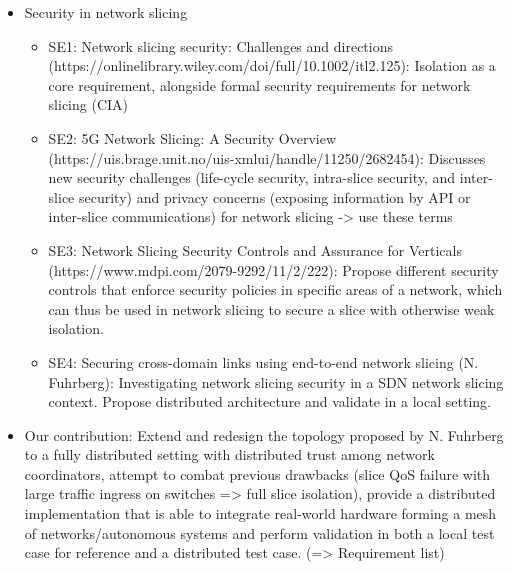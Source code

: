 \documentclass{article}
\begin{document}
\begin{itemize}
\begin{itemize}
    \end{itemize}
    \item Security in network slicing
    \begin{itemize}
        \item SE1: Network slicing security: Challenges and directions (https://onlinelibrary.wiley.com/doi/full/10.1002/itl2.125): Isolation as a core requirement, alongside formal security requirements for network slicing (CIA)
        \item SE2: 5G Network Slicing: A Security Overview (https://uis.brage.unit.no/uis-xmlui/handle/11250/2682454): Discusses new security challenges (life-cycle security, intra-slice security, and inter-slice security) and privacy concerns (exposing information by API or inter-slice communications) for network slicing -> use these terms
        \item SE3: Network Slicing Security Controls and Assurance for Verticals (https://www.mdpi.com/2079-9292/11/2/222): Propose different security controls that enforce security policies in specific areas of a network, which can thus be used in network slicing to secure a slice with otherwise weak isolation.
        \item SE4: Securing cross-domain links using end-to-end network slicing (N. Fuhrberg): Investigating network slicing security in a SDN network slicing context. Propose distributed architecture and validate in a local setting.
    \end{itemize}
    \item Our contribution: Extend and redesign the topology proposed by N. Fuhrberg to a fully distributed setting with distributed trust among network coordinators, attempt to combat previous drawbacks (slice QoS failure with large traffic ingress on switches => full slice isolation), provide a distributed implementation that is able to integrate real-world hardware forming a mesh of networks/autonomous systems and perform validation in both a local test case for reference and a distributed test case. (=> Requirement list)
\end{itemize}
\fi
\end{document}
